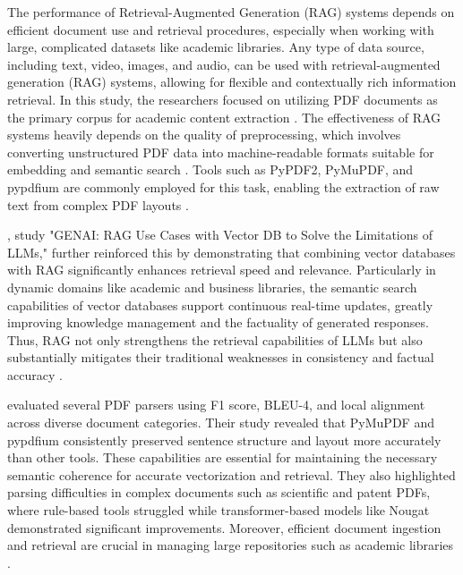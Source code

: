 \begin{refsection}
\hspace{1cm}The performance of Retrieval-Augmented Generation (RAG) systems depends on efficient document use and retrieval procedures, especially when working with large, complicated datasets like academic libraries. Any type of data source, including text, video, images, and audio, can be used with retrieval-augmented generation (RAG) systems, allowing for flexible and contextually rich information retrieval. In this study, the researchers focused on utilizing PDF documents as the primary corpus for academic content extraction \cite{li2023extracting}. The effectiveness of RAG systems heavily depends on the quality of preprocessing, which involves converting unstructured PDF data into machine-readable formats suitable for embedding and semantic search \cite{arzideh2024miracle} \cite{aquino2024extracting}. Tools such as PyPDF2, PyMuPDF, and pypdfium are commonly employed for this task, enabling the extraction of raw text from complex PDF layouts \cite{adhikari2024comparative}.

\bigbreak
\hspace{0.4cm} \citeauthor{sagi2024genai} \citeyear{sagi2024genai}, study "GENAI: RAG Use Cases with Vector DB to Solve the Limitations of LLMs," further reinforced this by demonstrating that combining vector databases with RAG significantly enhances retrieval speed and relevance. Particularly in dynamic domains like academic and business libraries, the semantic search capabilities of vector databases support continuous real-time updates, greatly improving knowledge management and the factuality of generated responses. Thus, RAG not only strengthens the retrieval capabilities of LLMs but also substantially mitigates their traditional weaknesses in consistency and factual accuracy \cite{sagi2024genai}.

\bigbreak
\hspace{0.4cm} \citeauthor{adhikari2024comparative} \citeyear{adhikari2024comparative} evaluated several PDF parsers using F1 score, BLEU-4, and local alignment across diverse document categories. Their study revealed that PyMuPDF and pypdfium consistently preserved sentence structure and layout more accurately than other tools. These capabilities are essential for maintaining the necessary semantic coherence for accurate vectorization and retrieval. They also highlighted parsing difficulties in complex documents such as scientific and patent PDFs, where rule-based tools struggled while transformer-based models like Nougat demonstrated significant improvements. Moreover, efficient document ingestion and retrieval are crucial in managing large repositories such as academic libraries \cite{adhikari2024comparative}.


\end{refsection}
